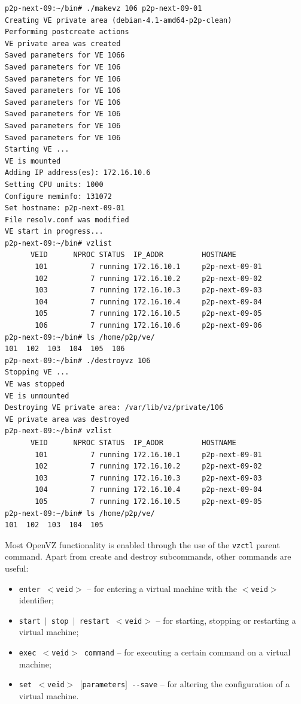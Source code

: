 \footnotesize
\begin{verbatim}
p2p-next-09:~/bin# ./makevz 106 p2p-next-09-01
Creating VE private area (debian-4.1-amd64-p2p-clean)
Performing postcreate actions
VE private area was created
Saved parameters for VE 1066
Saved parameters for VE 106
Saved parameters for VE 106
Saved parameters for VE 106
Saved parameters for VE 106
Saved parameters for VE 106
Saved parameters for VE 106
Saved parameters for VE 106
Starting VE ...
VE is mounted
Adding IP address(es): 172.16.10.6
Setting CPU units: 1000
Configure meminfo: 131072
Set hostname: p2p-next-09-01
File resolv.conf was modified
VE start in progress...
p2p-next-09:~/bin# vzlist
      VEID      NPROC STATUS  IP_ADDR         HOSTNAME
       101          7 running 172.16.10.1     p2p-next-09-01
       102          7 running 172.16.10.2     p2p-next-09-02
       103          7 running 172.16.10.3     p2p-next-09-03
       104          7 running 172.16.10.4     p2p-next-09-04
       105          7 running 172.16.10.5     p2p-next-09-05
       106          7 running 172.16.10.6     p2p-next-09-06
p2p-next-09:~/bin# ls /home/p2p/ve/
101  102  103  104  105  106
p2p-next-09:~/bin# ./destroyvz 106
Stopping VE ...
VE was stopped
VE is unmounted
Destroying VE private area: /var/lib/vz/private/106
VE private area was destroyed
p2p-next-09:~/bin# vzlist
      VEID      NPROC STATUS  IP_ADDR         HOSTNAME
       101          7 running 172.16.10.1     p2p-next-09-01
       102          7 running 172.16.10.2     p2p-next-09-02
       103          7 running 172.16.10.3     p2p-next-09-03
       104          7 running 172.16.10.4     p2p-next-09-04
       105          7 running 172.16.10.5     p2p-next-09-05
p2p-next-09:~/bin# ls /home/p2p/ve/
101  102  103  104  105
\end{verbatim}
\normalsize

Most OpenVZ functionality is enabled through the use of the \texttt{vzctl}
parent command. Apart from create and destroy subcommands, other commands are
useful:

\begin{itemize}
  \item \texttt{enter $<$veid$>$} -- for entering a virtual machine with the
  \texttt{$<$veid$>$} identifier;
  \item \texttt{start $|$ stop $|$ restart $<$veid$>$} -- for starting,
  stopping or restarting a virtual machine;
  \item \texttt{exec $<$veid$>$ command} -- for executing a certain command on
  a virtual machine;
  \item \texttt{set $<$veid$>$ $[$parameters$]$ -{}-save} -- for altering the
  configuration of a virtual machine.
\end{itemize}


